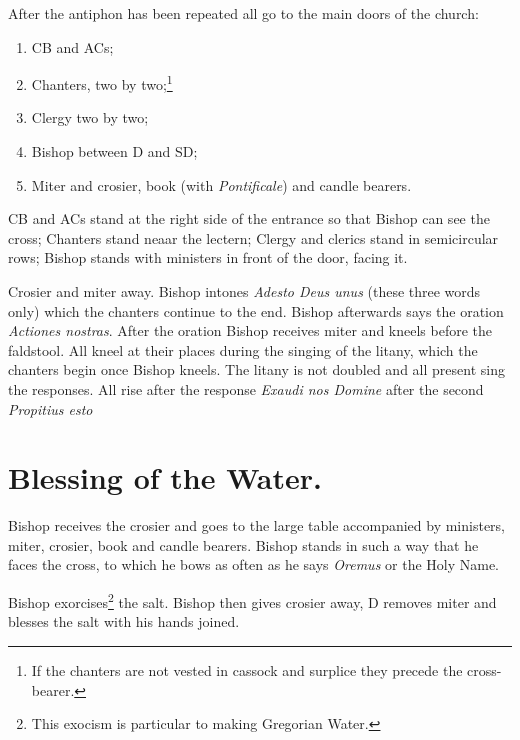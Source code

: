 \documentclass[letterpaper]{report}
\begin{document}
{\rubric After the antiphon has been repeated all go to the main doors of the
church:

\begin{enumerate}

    \item CB and ACs;

    \item Chanters, two by two;\footnote{If the chanters are not vested in
        cassock and surplice they precede the cross-bearer.}

    \item Clergy two by two;

    \item Bishop between D and SD;

    \item Miter and crosier, book (with \textit{Pontificale}) and candle
        bearers.

\end{enumerate}

CB and ACs stand at the right side of the entrance so that Bishop can see the cross;
Chanters stand neaar the lectern; Clergy and clerics stand in semicircular
rows; Bishop stands with ministers in front of the door, facing it.

\rubric Crosier and miter away. Bishop intones \textit{Adesto Deus unus} (these
three words only) which the chanters continue to the end. Bishop afterwards says the
oration \textit{Actiones nostras}. After the oration Bishop receives miter and
kneels before the faldstool. All kneel at their places during the singing of
the litany, which the chanters begin once Bishop kneels. The litany is not doubled
and all present sing the responses. All rise after the response \textit{Exaudi
nos Domine} after the second \textit{Propitius esto}

\section{Blessing of the Water.}

\rubric Bishop receives the crosier and goes to the large table accompanied by
ministers, miter, crosier, book and candle bearers. Bishop stands in such a way that
he faces the cross, to which he bows as often as he says \textit{Oremus} or the
Holy Name.

\rubric Bishop exorcises\footnote{This exocism is particular to making Gregorian
Water.} the salt. Bishop then gives crosier away, D removes miter and blesses the
salt with his hands joined.

}
\end{document}
